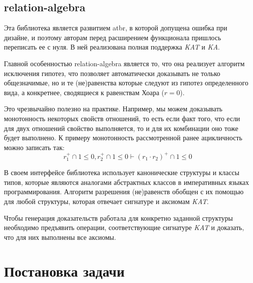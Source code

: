 \documentclass[times
              ]{itmo-student-thesis}
\begin{document}
    \subsection{relation-algebra}

      Эта библиотека является развитием atbr, в которой допущена ошибка при дизайне, и поэтому
      авторам перед расширением функционала пришлось переписать ее с нуля. В ней реализована полная
      поддержка \textit{KAT} и \textit{KA}.

      Главной особенностью relation-algebra является то, что она реализует алгоритм исключения гипотез\cite{},
      что позволяет автоматически доказывать
      не только общезначимые, но и те (не)равенства которые следуют из гипотез определенного вида, а
      конкретнее, сводящиеся к равенствам Хоара ($ r = 0 $).

      Это чрезвычайно полезно на практике.
      Например, мы можем доказывать монотонность некоторых свойств отношений,
      то есть если факт того, что если для двух отношений свойство выполняется, то и для их комбинации
      оно тоже будет выполнено.
      К примеру монотонность рассмотренной ранее ацикличность можно записать так:
      $$ r_1^+ \cap 1 \leq 0, r_2^+ \cap 1 \leq 0 \vdash (r_1 \cdot r_2)^+ \cap 1 \leq 0 $$

      В своем интерфейсе библиотека использует канонические структуры и классы типов, которые являются
      аналогами абстрактных классов в императивных языках программирования.
      Алгоритм разрешения (не)равенств обобщен с их помощью для любой структуры, которая отвечает
      сигнатуре и аксиомам \textit{KAT}.

      Чтобы генерация доказательств работала для конкретно заданной структуры необходимо предъявить
      операции, соответствующие сигнатуре \textit{KAT} и доказать, что для них выполнены все аксиомы.

\finishrelatedwork

  \section{Постановка задачи}
\end{document}
